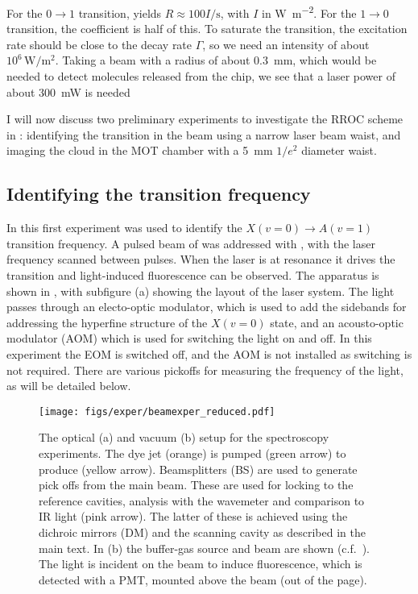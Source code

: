For the $0\rightarrow1$ transition, 
yields $R \approx 100 I \si{\per\second}$, with $I$ in
\si{\watt\per\meter\squared}. For the $1\rightarrow0$ transition, the
coefficient is half of this. To saturate the transition, the excitation rate
should be close to the decay rate $\Gamma$, so we need an intensity of about
$10^6\,\si{\watt\per\meter\squared}$. Taking a beam with a radius of about
\SI{0.3}{\milli\meter}, which would be needed to detect molecules released from
the chip, we see that a laser power of about \SI{300}{\milli\watt} is needed

I will now discuss two preliminary experiments to investigate the RROC scheme
in \CaF{}: identifying the transition in the \CaF{} beam using a narrow laser
beam waist, and imaging the \CaF{} cloud in the MOT chamber with a
\SI{5}{\milli\meter} $1/e^2$ diameter waist.

\subsection{Identifying the transition frequency}

In this first experiment  was used to identify the $X(v=0)
\rightarrow A(v=1)$ transition frequency. A pulsed beam of \CaF{} was addressed
with , with the laser frequency scanned between pulses.  When the
laser is at resonance it drives the transition and light-induced fluorescence
can be observed. The apparatus is shown in , with
subfigure (a) showing the layout of the  laser system. The
light passes through an electo-optic modulator, which is used
to add the sidebands for addressing the hyperfine structure of the $X(v=0)$
state, and an acousto-optic modulator (AOM) which is used for switching the
light on and off. In this experiment the EOM is switched off, and the AOM is
not installed as switching is not required. There are various pickoffs for
measuring the frequency of the light, as will be detailed below.

\begin{figure}
  \centering
  \texttt{[image: figs/exper/beamexper\_reduced.pdf]}
  \caption[Optical and vacuum setup for RROC spectroscopy experiment]{
    The optical (a) and vacuum (b) setup for the spectroscopy
    experiments. The dye jet (orange) is pumped (green
    arrow) to produce  (yellow arrow). Beamsplitters (BS) are used
    to generate pick offs from the main beam. These are used for locking to the
    reference cavities, analysis with the wavemeter and comparison to IR light
    (pink arrow). The latter of these is achieved using the dichroic mirrors
    (DM) and  the scanning cavity as described in the main text. In (b) the
    buffer-gas source and \CaF{} beam are shown
    (c.f.~). The  light is
    incident on the beam to induce fluorescence, which is detected with a PMT,
    mounted above the beam (out of the page).
  }
  \label{exper:fig:beamapp} 
\end{figure}

